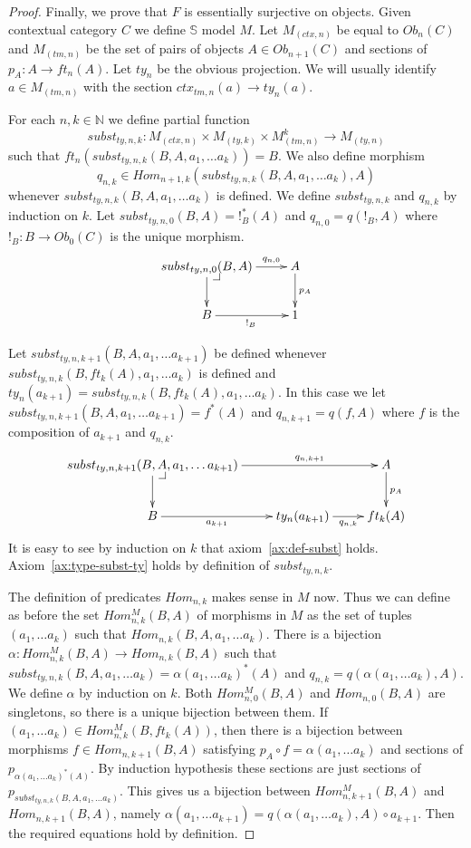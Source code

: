 \documentclass[reqno]{amsart}
\makeatletter
\theoremstyle{definition}
\theoremstyle{remark}
\newcommand{\substTh}{\mathbb{S}}
\numberwithin{figure}{section}
\newcommand{\pb}[1][dr]{\save*!/#1-1.2pc/#1:(-1,1)@^{|-}\restore}
\makeatother
\begin{document}
\begin{proof}
Finally, we prove that $F$ is essentially surjective on objects.
Given contextual category $C$ we define $\substTh$ model $M$.
Let $M_{(ctx,n)}$ be equal to $Ob_n(C)$ and $M_{(tm,n)}$ be the set of pairs of objects $A \in Ob_{n+1}(C)$ and sections of $p_A : A \to ft_n(A)$.
Let $ty_n$ be the obvious projection.
We will usually identify $a \in M_{(tm,n)}$ with the section $ctx_{tm,n}(a) \to ty_n(a)$.

For each $n,k \in \mathbb{N}$ we define partial function
\[ subst_{ty,n,k} : M_{(ctx,n)} \times M_{(ty,k)} \times M_{(tm,n)}^k \to M_{(ty,n)} \]
such that $ft_n(subst_{ty,n,k}(B, A, a_1, \ldots a_k)) = B$.
We also define morphism
\[ q_{n,k} \in Hom_{n+1,k}(subst_{ty,n,k}(B, A, a_1, \ldots a_k), A) \]
whenever $subst_{ty,n,k}(B, A, a_1, \ldots a_k)$ is defined.
We define $subst_{ty,n,k}$ and $q_{n,k}$ by induction on $k$.
Let $subst_{ty,n,0}(B,A) = !_B^*(A)$ and $q_{n,0} = q(!_B,A)$ where $!_B : B \to Ob_0(C)$ is the unique morphism.
\[ \xymatrix{ subst_{ty,n,0}(B,A) \ar[r]^-{q_{n,0}} \ar[d] \pb & A \ar[d]^{p_A} \\
              B \ar[r]_{!_B} & 1
            } \]

Let $subst_{ty,n,k+1}(B, A, a_1, \ldots a_{k+1})$ be defined whenever $subst_{ty,n,k}(B, ft_k(A), \allowbreak a_1, \ldots a_k)$ is defined
    and $ty_n(a_{k+1}) = subst_{ty,n,k}(B, ft_k(A), a_1, \ldots a_k)$.
In this case we let $subst_{ty,n,k+1}(B, A, a_1, \ldots a_{k+1}) = f^*(A)$ and $q_{n,k+1} = q(f,A)$ where $f$ is the composition of $a_{k+1}$ and $q_{n,k}$.
\[ \xymatrix{ subst_{ty,n,k+1}(B, A, a_1, \ldots a_{k+1}) \ar[rr]^-{q_{n,k+1}} \ar[d] \pb & & A \ar[d]^{p_A} \\
              B \ar[r]_-{a_{k+1}} & ty_n(a_{k+1}) \ar[r]_-{q_{n,k}} & ft_k(A)
            } \]
It is easy to see by induction on $k$ that axiom~\eqref{ax:def-subst} holds.
Axiom~\eqref{ax:type-subst-ty} holds by definition of $subst_{ty,n,k}$.

The definition of predicates $Hom_{n,k}$ makes sense in $M$ now.
Thus we can define as before the set $Hom^M_{n,k}(B,A)$ of morphisms in $M$ as the set of tuples $(a_1, \ldots a_k)$ such that $Hom_{n,k}(B, A, a_1, \ldots a_k)$.
There is a bijection $\alpha : Hom^M_{n,k}(B,A) \to Hom_{n,k}(B,A)$ such that
    $subst_{ty,n,k}(B, A, a_1, \ldots a_k) = \alpha(a_1, \ldots a_k)^*(A)$ and $q_{n,k} = q(\alpha(a_1, \ldots a_k), A)$.
We define $\alpha$ by induction on $k$.
Both $Hom^M_{n,0}(B,A)$ and $Hom_{n,0}(B,A)$ are singletons, so there is a unique bijection between them.
If $(a_1, \ldots a_k) \in Hom^M_{n,k}(B,ft_k(A))$, then there is a bijection between morphisms $f \in Hom_{n,k+1}(B,A)$
    satisfying $p_A \circ f = \alpha(a_1, \ldots a_k)$ and sections of $p_{\alpha(a_1, \ldots a_k)^*(A)}$.
By induction hypothesis these sections are just sections of $p_{subst_{ty,n,k}(B, A, a_1, \ldots a_k)}$.
This gives us a bijection between $Hom^M_{n,k+1}(B,A)$ and $Hom_{n,k+1}(B,A)$, namely $\alpha(a_1, \ldots a_{k+1}) = q(\alpha(a_1, \ldots a_k), A) \circ a_{k+1}$.
Then the required equations hold by definition.


\end{proof}
\end{document}
